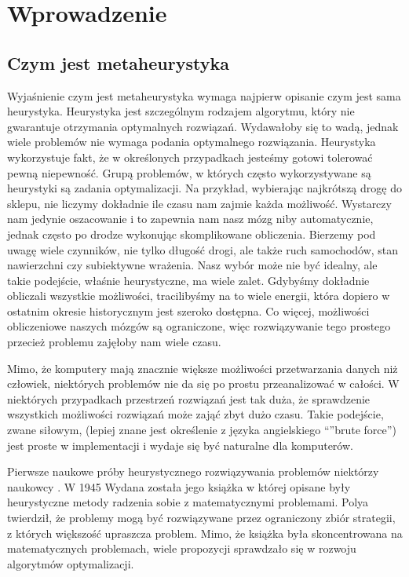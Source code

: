 \documentclass[twoside]{iisthesis}
\begin{document}
\chapter*{Wprowadzenie}

\section{Czym jest metaheurystyka}
Wyjaśnienie czym jest metaheurystyka wymaga najpierw opisanie czym jest sama heurystyka. Heurystyka jest szczególnym rodzajem algorytmu, który nie gwarantuje otrzymania optymalnych rozwiązań. Wydawałoby się to wadą, jednak wiele problemów nie wymaga podania optymalnego rozwiązania. Heurystyka wykorzystuje fakt, że w określonych przypadkach jesteśmy gotowi tolerować pewną niepewność. Grupą problemów, w których często wykorzystywane są heurystyki są zadania optymalizacji. Na przykład, wybierając najkrótszą drogę do sklepu, nie liczymy dokładnie ile czasu nam zajmie każda możliwość. Wystarczy nam jedynie oszacowanie i to zapewnia nam nasz mózg niby automatycznie, jednak często po drodze wykonując skomplikowane obliczenia. Bierzemy pod uwagę wiele czynników, nie tylko długość drogi, ale także ruch samochodów, stan nawierzchni czy subiektywne wrażenia. Nasz wybór może nie być idealny, ale takie podejście, właśnie heurystyczne, ma wiele zalet. Gdybyśmy dokładnie obliczali wszystkie możliwości, tracilibyśmy na to wiele energii, która dopiero w ostatnim okresie historycznym jest szeroko dostępna. Co więcej, możliwości obliczeniowe naszych mózgów są ograniczone, więc rozwiązywanie tego prostego przecież problemu zajęłoby nam wiele czasu.

Mimo, że komputery mają znacznie większe możliwości przetwarzania danych niż człowiek, niektórych problemów nie da się po prostu przeanalizować w całości. W niektórych przypadkach przestrzeń rozwiązań jest tak duża, że sprawdzenie wszystkich możliwości rozwiązań może zająć zbyt dużo czasu. Takie podejście, zwane siłowym, (lepiej znane jest określenie z języka angielskiego ``''brute force'') jest proste w implementacji i wydaje się być naturalne dla komputerów.

Pierwsze naukowe próby heurystycznego rozwiązywania problemów niektórzy naukowcy \cite{history-meta} . W 1945 Wydana została jego książka  \cite{polya} w której opisane były heurystyczne metody radzenia sobie z matematycznymi problemami. Polya twierdził, że problemy mogą być rozwiązywane przez ograniczony zbiór strategii, z których większość upraszcza problem. Mimo, że książka była skoncentrowana na matematycznych problemach, wiele propozycji sprawdzało się w rozwoju algorytmów optymalizacji.
\end{document}
